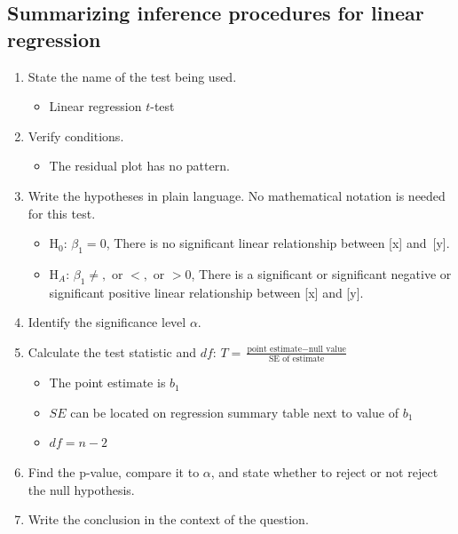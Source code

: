 \subsection{Summarizing inference procedures for linear regression}

\begin{termBox}{
\begin{enumerate}
\setlength{\itemsep}{0mm}
\item State the name of the test being used.\vspace{-1.5mm}
\begin{itemize}
\setlength{\itemsep}{0mm}
\item Linear regression $t$-test
\end{itemize}
\item Verify conditions.\vspace{-1.5mm}
\begin{itemize}
\setlength{\itemsep}{0mm}
\item The residual plot has no pattern.
\end{itemize}
\item Write the hypotheses in plain language.  No mathematical notation is needed for this test.\vspace{-1.5mm}
\begin{itemize}
\setlength{\itemsep}{0mm}
\item H$_0$: $\beta_1=0$, There is no significant linear relationship between [x] and~[y]. 
\item H$_A$: $\beta_1 \ne,\text{ or }<, \text{ or }>0$, There is a significant or significant negative or significant positive linear relationship between [x] and [y].  
\end{itemize}
\item Identify the significance level $\alpha$.
\item Calculate the test statistic and $df$: $T = \frac{\text{point estimate} - \text{null value}}{\text{SE of estimate}}$\vspace{-1.5mm}
\begin{itemize}
\setlength{\itemsep}{0mm}
\item The point estimate is $b_1$
\item $SE$ can be located on regression summary table next to value of $b_1$
\item $df = n-2$
\end{itemize}
\item Find the p-value, compare it to $\alpha$, and state whether to reject or not reject the null hypothesis.
\item Write the conclusion in the context of the question.
\end{enumerate}}
\end{termBox}

